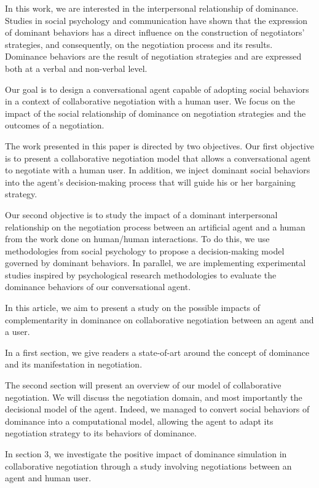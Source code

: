 \documentclass[10pt, a4paper]{article} %
\begin{document}
In this work, we are interested in the interpersonal relationship of dominance. Studies in social psychology and communication have shown that the expression of dominant behaviors has a direct influence on the construction of negotiators' strategies, and consequently, on the negotiation process and its results.
Dominance behaviors are the result of negotiation strategies and are expressed  both at a verbal and non-verbal level.

Our goal is to design a conversational agent capable of adopting social behaviors in a context of collaborative negotiation with a human user. We focus on the impact of the social relationship of dominance on negotiation strategies and the outcomes of a negotiation.

The work presented in this paper is directed by two objectives. 
Our first objective is to present a collaborative negotiation model that allows a conversational agent to negotiate with a human user. In addition, we inject dominant social behaviors into the agent's decision-making process that will guide his or her bargaining strategy.

Our second objective is to study the impact of a dominant interpersonal relationship on the negotiation process between an artificial agent and a human from the work done on human/human interactions.
To do this, we use methodologies from social psychology to propose a decision-making model governed by dominant behaviors. In parallel, we are implementing experimental studies inspired by psychological research methodologies to evaluate the dominance behaviors of our conversational agent. 

In this article, we aim to present a study on the possible impacts of complementarity in dominance on collaborative negotiation between an agent and a user.

In a first section, we give readers a state-of-art around the concept of dominance and its manifestation in negotiation. 

The second section will present an overview of our model of collaborative negotiation. We will discuss the negotiation domain, and most importantly the decisional model of the agent. Indeed, we managed to convert social behaviors of dominance into a computational model, allowing the agent to adapt its negotiation strategy to its behaviors of dominance.

In section 3, we investigate the positive impact of dominance simulation in collaborative negotiation through a study involving negotiations between an agent and human user.
\end{document}
